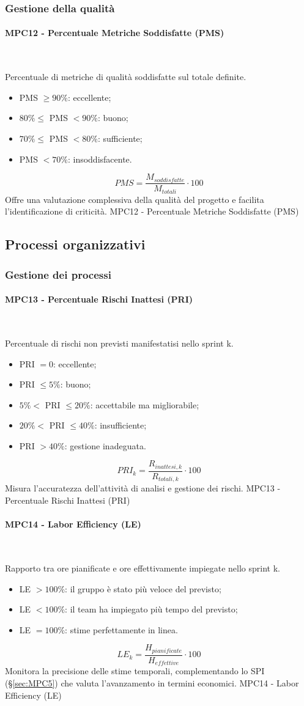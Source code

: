 \documentclass[10pt, letterpaper]{article}
\newcommand{\trisubsection}[1]{\paragraph{#1}\mbox{}\\}
\begin{document}
\subsubsection{Gestione della qualità}
\trisubsection{MPC12 - Percentuale Metriche Soddisfatte (PMS)}
{Percentuale di metriche di qualità soddisfatte sul totale definite.
    \begin{itemize}
        \item PMS $\geq 90\%$: eccellente;
        \item $80\% \leq$ PMS $< 90\%$: buono;
        \item $70\% \leq$ PMS $< 80\%$: sufficiente;
        \item PMS $< 70\%$: insoddisfacente.
    \end{itemize}}
{\[ PMS = \frac{M_{soddisfatte}}{M_{totali}} \cdot 100 \]}
{Offre una valutazione complessiva della qualità del progetto e facilita l'identificazione di criticità.}
{MPC12 - Percentuale Metriche Soddisfatte (PMS)}

\subsection{Processi organizzativi}
\subsubsection{Gestione dei processi}

\trisubsection{MPC13 - Percentuale Rischi Inattesi (PRI)}
{Percentuale di rischi non previsti manifestatisi nello sprint k.
    \begin{itemize}
        \item PRI $= 0$: eccellente;
        \item PRI $\leq 5\%$: buono;
        \item $5\% <$ PRI $\leq 20\%$: accettabile ma migliorabile;
        \item $20\% <$ PRI $\leq 40\%$: insufficiente;
        \item PRI $> 40\%$: gestione inadeguata.
    \end{itemize}}
{\[ PRI_k = \frac{R_{inattesi,k}}{R_{totali,k}} \cdot 100 \]}
{Misura l'accuratezza dell'attività di analisi e gestione dei rischi.}
{MPC13 - Percentuale Rischi Inattesi (PRI)}

\trisubsection{MPC14 - Labor Efficiency (LE)}
{Rapporto tra ore pianificate e ore effettivamente impiegate nello sprint k.
    \begin{itemize}
        \item LE $> 100\%$: il gruppo è stato più veloce del previsto;
        \item LE $< 100\%$: il team ha impiegato più tempo del previsto;
        \item LE $= 100\%$: stime perfettamente in linea.
    \end{itemize}}
{\[ LE_k = \frac{H_{pianificate}}{H_{effettive}} \cdot 100 \]}
{Monitora la precisione delle stime temporali, complementando lo SPI (§\ref{sec:MPC5}) che valuta l'avanzamento in termini economici.}
{MPC14 - Labor Efficiency (LE)}
\end{document}
